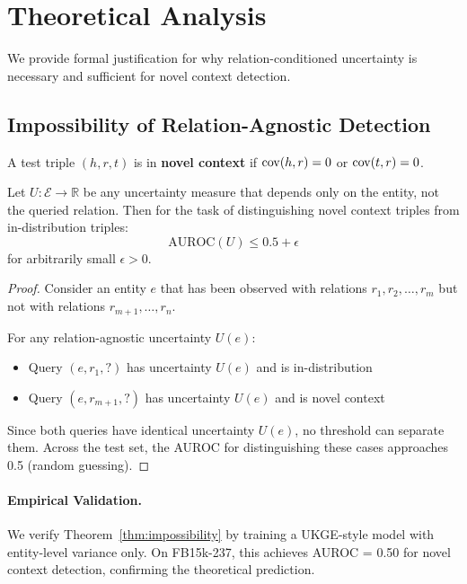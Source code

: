 \section{Theoretical Analysis}
\label{sec:theory}

We provide formal justification for why relation-conditioned uncertainty is necessary and sufficient for novel context detection.

\subsection{Impossibility of Relation-Agnostic Detection}

\begin{definition}
A test triple $(h, r, t)$ is in \textbf{novel context} if $\mathrm{cov}(h, r) = 0$ or $\mathrm{cov}(t, r) = 0$.
\end{definition}

\begin{theorem}[Impossibility]
\label{thm:impossibility}
Let $U: \mathcal{E} \to \mathbb{R}$ be any uncertainty measure that depends only on the entity, not the queried relation. Then for the task of distinguishing novel context triples from in-distribution triples:
\[
\text{AUROC}(U) \leq 0.5 + \epsilon
\]
for arbitrarily small $\epsilon > 0$.
\end{theorem}

\begin{proof}
Consider an entity $e$ that has been observed with relations $r_1, r_2, \ldots, r_m$ but not with relations $r_{m+1}, \ldots, r_n$.

For any relation-agnostic uncertainty $U(e)$:
\begin{itemize}
    \item Query $(e, r_1, ?)$ has uncertainty $U(e)$ and is in-distribution
    \item Query $(e, r_{m+1}, ?)$ has uncertainty $U(e)$ and is novel context
\end{itemize}

Since both queries have identical uncertainty $U(e)$, no threshold can separate them. Across the test set, the AUROC for distinguishing these cases approaches 0.5 (random guessing).
\end{proof}

\paragraph{Empirical Validation.}
We verify Theorem~\ref{thm:impossibility} by training a UKGE-style model with entity-level variance only. On FB15k-237, this achieves AUROC = 0.50 for novel context detection, confirming the theoretical prediction.

